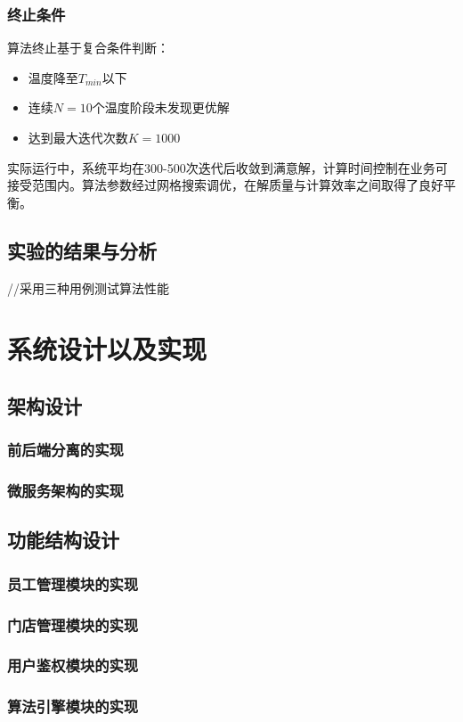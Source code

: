 \documentclass{ctexart}
\begin{document}
\subsubsection{终止条件}
算法终止基于复合条件判断：
\begin{itemize}
    \item 温度降至$T_{min}$以下
    \item 连续$N=10$个温度阶段未发现更优解
    \item 达到最大迭代次数$K=1000$
\end{itemize}

实际运行中，系统平均在300-500次迭代后收敛到满意解，计算时间控制在业务可接受范围内。算法参数经过网格搜索调优，在解质量与计算效率之间取得了良好平衡。

\subsection{实验的结果与分析}
//采用三种用例测试算法性能


\section{系统设计以及实现}
\subsection{架构设计}
\subsubsection{前后端分离的实现}
\subsubsection{微服务架构的实现}
\subsection{功能结构设计}
\subsubsection{员工管理模块的实现}
\subsubsection{门店管理模块的实现}
\subsubsection{用户鉴权模块的实现}
\subsubsection{算法引擎模块的实现}
\end{document}
